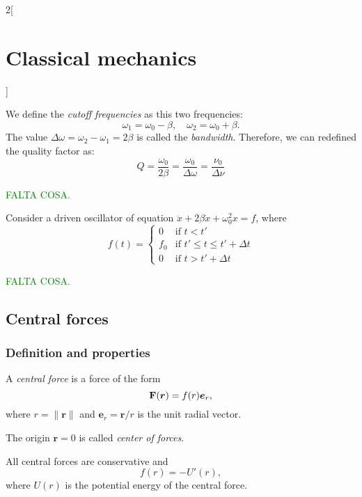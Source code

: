 \documentclass[../../../main.tex]{subfiles}
\begin{document}
\begin{multicols}{2}[\section{Classical mechanics}]
\begin{prop}
  \end{prop}
  \begin{definition}
    We define the \textit{cutoff frequencies} as this two frequencies: $$\omega_1=\omega_0-\beta,\quad\omega_2=\omega_0+\beta.$$ The value  $\Delta\omega=\omega_2-\omega_1=2\beta$ is called the \textit{bandwidth}. Therefore, we can redefined the quality factor as: $$Q=\frac{\omega_0}{2\beta}=\frac{\omega_0}{\Delta\omega}=\frac{\nu_0}{\Delta\nu}$$
  \end{definition}
  \textcolor{green}{FALTA COSA.}
  \begin{prop}
    Consider a driven oscillator of equation $\ddot{x}+2\beta\dot{x}+\omega_0^2x=f$, where $$f(t)=\left\{
      \begin{array}{cc}
        0   & \text{if } t<t'                    \\
        f_0 & \text{if }t'\leq t\leq t'+\Delta t \\
        0   & \text{if } t>t'+\Delta t
      \end{array}\right.$$
  \end{prop}
  \textcolor{green}{FALTA COSA.}
  \subsection{Central forces}
  \subsubsection{Definition and properties}
  \begin{definition}
    A \textit{central force} is a force of the form $$\boldsymbol{\mathrm{F}}(\boldsymbol{r})=f(r)\boldsymbol{e}_r,$$ where $r=\|\boldsymbol{r}\|$ and $\boldsymbol{e}_r=\boldsymbol{r}/r$ is the unit radial vector.
  \end{definition}
  \begin{definition}
    The origin $\boldsymbol{r}=0$ is called \textit{center of forces}.
  \end{definition}
  \begin{prop}
    All central forces are conservative and $$f(r)=-U'(r),$$ where $U(r)$ is the potential energy of the central force.
  \end{prop}

\end{multicols}
\end{document}
